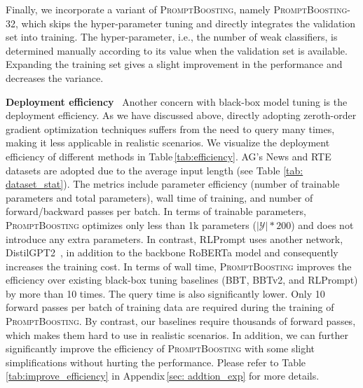 \documentclass{article}
\theoremstyle{plain}
\theoremstyle{definition}
\theoremstyle{remark}
\newcommand{\alg}{\textsc{PromptBoosting}}
\begin{document}
Finally, we incorporate a variant of {\alg}, namely {\alg}-32, which skips the hyper-parameter tuning and directly integrates the validation set into training. The hyper-parameter, i.e., the number of weak classifiers, is determined manually according to its value when the validation set is available. Expanding the training set gives a slight improvement in the performance and decreases the variance.

\noindent \textbf{Deployment efficiency} \ 
Another concern with black-box model tuning is the deployment efficiency. As we have discussed above, directly adopting zeroth-order gradient optimization techniques suffers from the need to query many times, making it less applicable in realistic scenarios. We visualize the deployment efficiency of different methods in Table\,\ref{tab:efficiency}. AG's News and RTE datasets are adopted due to the average input length (see Table \ref{tab: dataset_stat}). The metrics include parameter efficiency (number of trainable parameters and total parameters), wall time of training, and number of forward/backward passes per batch. In terms of trainable parameters, {\alg} optimizes only less than 1k parameters ($|\mathcal{Y}| * 200$) and does not introduce any extra parameters. In contrast, RLPrompt uses another network, DistilGPT2~\citep{sanh2019distilbert}, in addition to the backbone RoBERTa model and consequently increases the training cost. In terms of wall time, {\alg} improves the efficiency over existing black-box tuning baselines (BBT, BBTv2, and RLPrompt) by more than 10 times. The query time is also significantly lower. Only 10 forward passes per batch of training data are required during the training of {\alg}. By contrast, our baselines require thousands of forward passes, which makes them hard to use in realistic scenarios. 
In addition, we can further significantly improve the efficiency of {\alg} with some slight simplifications without hurting the performance. Please refer to Table\,\ref{tab:improve_efficiency} in Appendix\,\ref{sec: addtion_exp} for more details.
\end{document}
